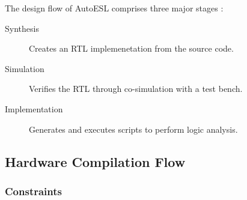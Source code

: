 The design flow of AutoESL comprises three major stages \cite{XILINX:Tutorial}:
\begin{description}
    \item[Synthesis] Creates an \gls{RTL} implemenetation from the source code.
    \item[Simulation] Verifies the \gls{RTL} through co-simulation with a test
        bench.
    \item[Implementation] Generates and executes scripts to perform logic
        analysis.
\end{description}

\subsection{Hardware Compilation Flow}
\label{hardwareCompilationFlow}

\subsubsection{Constraints}
\label{hardwareCompilationFlow:constraints}

